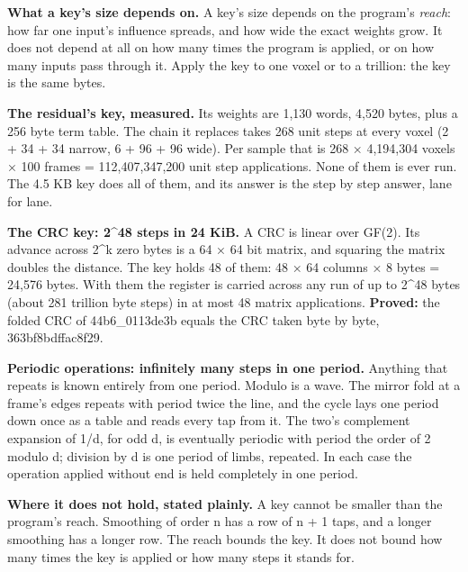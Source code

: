 \textbf{What a key's size depends on.} A key's size depends on the program's \emph{reach}: how far one input's influence spreads, and how wide the exact weights grow. It does not depend at all on how many times the program is applied, or on how many inputs pass through it. Apply the key to one voxel or to a trillion: the key is the same bytes.

\textbf{The residual's key, measured.} Its weights are 1,130 words, 4,520 bytes, plus a 256 byte term table. The chain it replaces takes 268 unit steps at every voxel (2 + 34 + 34 narrow, 6 + 96 + 96 wide). Per sample that is 268 × 4,194,304 voxels × 100 frames = 112,407,347,200 unit step applications. None of them is ever run. The 4.5 KB key does all of them, and its answer is the step by step answer, lane for lane.

\textbf{The CRC key: 2\textasciicircum{}48 steps in 24 KiB.} A CRC is linear over GF(2). Its advance across 2\textasciicircum{}k zero bytes is a 64 × 64 bit matrix, and squaring the matrix doubles the distance. The key holds 48 of them: 48 × 64 columns × 8 bytes = 24,576 bytes. With them the register is carried across any run of up to 2\textasciicircum{}48 bytes (about 281 trillion byte steps) in at most 48 matrix applications. \textbf{Proved:} the folded CRC of 44b6\_\allowbreak{}0113de3b equals the CRC taken byte by byte, 363bf8bdffac8f29.

\textbf{Periodic operations: infinitely many steps in one period.} Anything that repeats is known entirely from one period. Modulo is a wave. The mirror fold at a frame's edges repeats with period twice the line, and the cycle lays one period down once as a table and reads every tap from it. The two's complement expansion of 1/d, for odd d, is eventually periodic with period the order of 2 modulo d; division by d is one period of limbs, repeated. In each case the operation applied without end is held completely in one period.

\textbf{Where it does not hold, stated plainly.} A key cannot be smaller than the program's reach. Smoothing of order n has a row of n + 1 taps, and a longer smoothing has a longer row. The reach bounds the key. It does not bound how many times the key is applied or how many steps it stands for.

